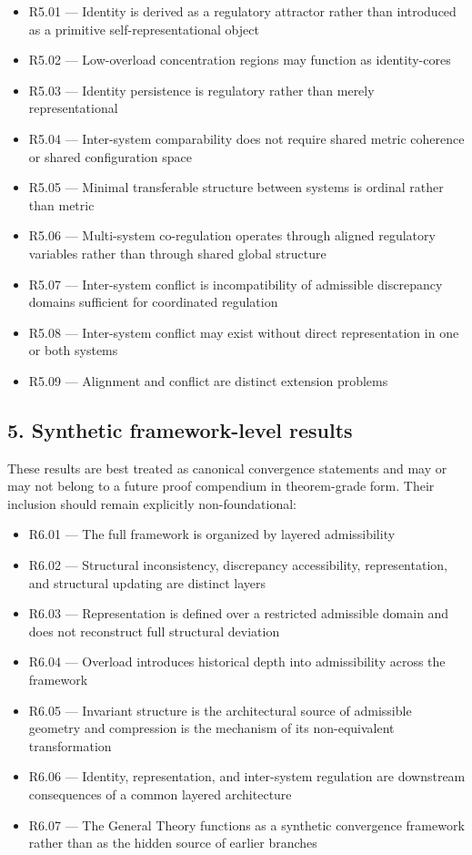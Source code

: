 \documentclass[12pt]{article}
\begin{document}
	\begin{itemize}[leftmargin=2em]
		\item R5.01 --- Identity is derived as a regulatory attractor rather than introduced as a primitive self-representational object
		\item R5.02 --- Low-overload concentration regions may function as identity-cores
		\item R5.03 --- Identity persistence is regulatory rather than merely representational
		\item R5.04 --- Inter-system comparability does not require shared metric coherence or shared configuration space
		\item R5.05 --- Minimal transferable structure between systems is ordinal rather than metric
		\item R5.06 --- Multi-system co-regulation operates through aligned regulatory variables rather than through shared global structure
		\item R5.07 --- Inter-system conflict is incompatibility of admissible discrepancy domains sufficient for coordinated regulation
		\item R5.08 --- Inter-system conflict may exist without direct representation in one or both systems
		\item R5.09 --- Alignment and conflict are distinct extension problems
	\end{itemize}
	
	\subsection*{5. Synthetic framework-level results}
	
	These results are best treated as canonical convergence statements and may or may not belong to a
	future proof compendium in theorem-grade form. Their inclusion should remain explicitly
	non-foundational:
	
	\begin{itemize}[leftmargin=2em]
		\item R6.01 --- The full framework is organized by layered admissibility
		\item R6.02 --- Structural inconsistency, discrepancy accessibility, representation, and structural updating are distinct layers
		\item R6.03 --- Representation is defined over a restricted admissible domain and does not reconstruct full structural deviation
		\item R6.04 --- Overload introduces historical depth into admissibility across the framework
		\item R6.05 --- Invariant structure is the architectural source of admissible geometry and compression is the mechanism of its non-equivalent transformation
		\item R6.06 --- Identity, representation, and inter-system regulation are downstream consequences of a common layered architecture
		\item R6.07 --- The General Theory functions as a synthetic convergence framework rather than as the hidden source of earlier branches
	\end{itemize}
	
\end{document}

